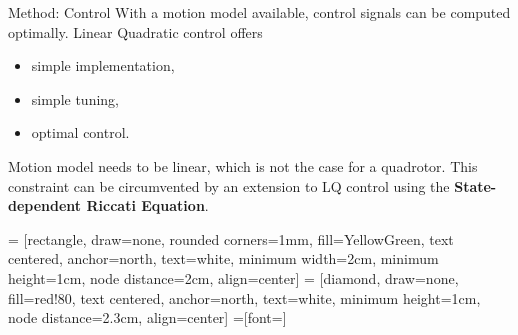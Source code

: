         \begin{frame}{Method: Control}
            With a motion model available, control signals can be computed optimally.
            Linear Quadratic control offers
            \begin{itemize}
                \item simple implementation,
                \item simple tuning,
                \item optimal control.
            \end{itemize}
            Motion model needs to be linear, which is not the case for a quadrotor.
            This constraint can be circumvented by an extension to LQ control using the
            \textbf{State-dependent Riccati Equation}.
        \end{frame}

     = [rectangle, draw=none, rounded corners=1mm, fill=YellowGreen,
                    text centered, anchor=north, text=white, minimum width=2cm, minimum height=1cm, node distance=2cm, align=center]
     = [diamond, draw=none, fill=red!80,
                    text centered, anchor=north, text=white, minimum height=1cm, node distance=2.3cm, align=center]
    =[font=\scriptsize]

